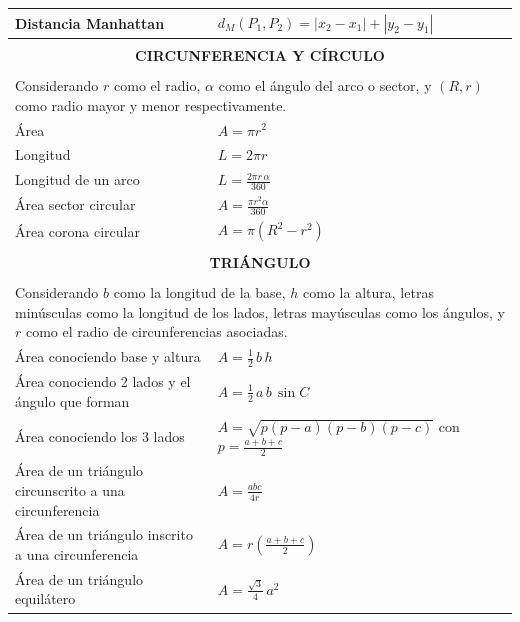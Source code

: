 \begin{center}
{\begin{tabular}{|p{}|p{}|}
Distancia Manhattan &
$\displaystyle d_{M}(P_{1}, P_{2}) = |x_{2} - x_{1}| + |y_{2} - y_{1}|$ \\ \hline

\multicolumn{2}{|c|}{} \\
\multicolumn{2}{|c|}{\textbf{CIRCUNFERENCIA Y CÍRCULO}} \\
\multicolumn{2}{|c|}{} \\ \hline

\multicolumn{2}{|p{0.96\columnwidth}|}{Considerando $r$ como el radio, $\alpha$ como el ángulo del arco o sector, y $(R,r)$ como radio mayor y menor respectivamente.} \\ \hline

Área                   & $\displaystyle A = \pi r^{2}$ \\ \hline
Longitud               & $\displaystyle L = 2\pi r$  \\ \hline
Longitud de un arco    & $\displaystyle L = \frac{2\pi r\,\alpha}{360}$  \\ \hline
Área sector circular   & $\displaystyle A = \frac{\pi r^{2} \alpha}{360}$ \\ \hline
Área corona circular   & $\displaystyle A = \pi (R^{2} - r^{2})$ \\ \hline

\multicolumn{2}{|c|}{} \\
\multicolumn{2}{|c|}{\textbf{TRIÁNGULO}} \\
\multicolumn{2}{|c|}{} \\ \hline

\multicolumn{2}{|p{0.96\columnwidth}|}{Considerando $b$ como la longitud de la base, $h$ como la altura, letras minúsculas como la longitud de los lados, letras mayúsculas como los ángulos, y $r$ como el radio de circunferencias asociadas.} \\ \hline

Área conociendo base y altura & $\displaystyle A = \frac{1}{2}\, b\, h$ \\ \hline
Área conociendo 2 lados y el ángulo que forman & $\displaystyle A = \frac{1}{2}\, a\, b\, \sin C$ \\ \hline
Área conociendo los 3 lados & $\displaystyle A = \sqrt{p(p - a)(p - b)(p - c)}$ con $\displaystyle p = \frac{a + b + c}{2}$ \\ \hline
Área de un triángulo circunscrito a una circunferencia & $\displaystyle A = \frac{abc}{4r}$ \\ \hline
Área de un triángulo inscrito a una circunferencia & $\displaystyle A = r\!\left(\frac{a+b+c}{2}\right)$ \\ \hline
Área de un triángulo equilátero & $\displaystyle A = \frac{\sqrt{3}}{4}\, a^{2}$ \\ \hline


\end{tabular}}
\end{center}
